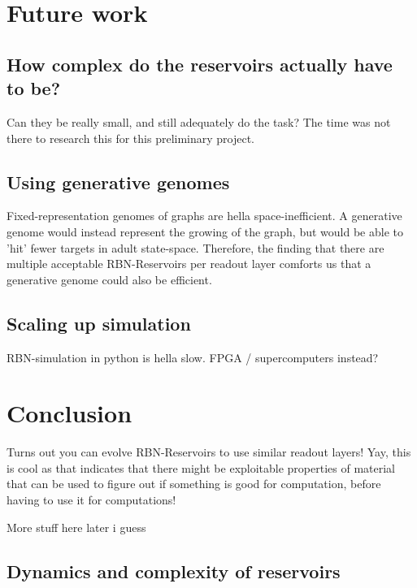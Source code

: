 \section{Future work}


\subsection{How complex do the reservoirs actually have to be?}

Can they be really small, and still adequately do the task?
The time was not there to research this for this preliminary project.

\subsection{Using generative genomes}

Fixed-representation genomes of graphs are hella space-inefficient.
A generative genome would instead represent the growing of the graph,
but would be able to 'hit' fewer targets in adult state-space.
Therefore, the finding that there are multiple acceptable RBN-Reservoirs per readout layer
comforts us that a generative genome could also be efficient.

\subsection{Scaling up simulation}

RBN-simulation in python is hella slow.
FPGA / supercomputers instead?

\section{Conclusion}


Turns out you can evolve RBN-Reservoirs to use similar readout layers!
Yay, this is cool as that indicates that there might be exploitable properties of material that can be used to figure out if something is good for computation, before having to use it for computations!

More stuff here later i guess

\subsection{Dynamics and complexity of reservoirs}

